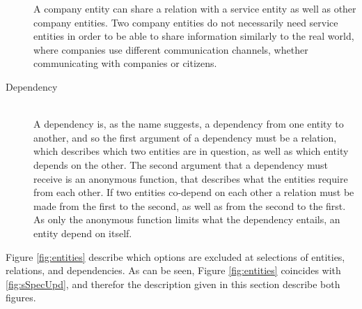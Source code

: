 \begin{description}
	A company entity can share a relation with a service entity as well as other company entities. Two company entities do not necessarily need service entities in order to be able to share information similarly to the real world, where companies use different communication channels, whether communicating with companies or citizens.
	\item[Dependency]\ \\
	A dependency is, as the name suggests, a dependency from one entity to another, and so the first argument of a dependency must be a relation, which describes which two entities are in question, as well as which entity depends on the other. The second argument that a dependency must receive is an anonymous function, that describes what the entities require from each other. If two entities co-depend on each other a relation must be made from the first to the second, as well as from the second to the first. As only the anonymous function limits what the dependency entails, an entity  depend on itself.
\end{description}

Figure \ref{fig:entities} describe which options are excluded at selections of entities, relations, and dependencies. As can be seen, Figure \ref{fig:entities} coincides with \ref{fig:sSpecUpd}, and therefor the description given in this section describe both figures. 

